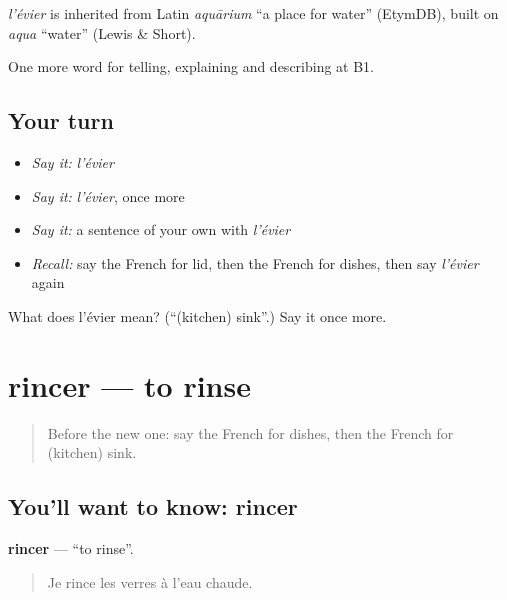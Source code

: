 \begin{cousinweb}
\emph{l'évier} is inherited from Latin \emph{aquārium} \textquotedblleft{}a place for water\textquotedblright{} (EtymDB), built on \emph{aqua} \textquotedblleft{}water\textquotedblright{} (Lewis \& Short).
\end{cousinweb}

\begin{grammarlens}[title={What you've built}]
One more word for telling, explaining and describing at B1.
\end{grammarlens}

\subsection*{Your turn}
\begin{itemize}
\raggedright
  \item \emph{Say it:} \emph{l'évier}
  \item \emph{Say it:} \emph{l'évier}, once more
  \item \emph{Say it:} a sentence of your own with \emph{l'évier}
  \item \emph{Recall:} say the French for lid, then the French for dishes, then say \emph{l'évier} again
\end{itemize}

\begin{tcolorbox}[breakable,colback=teal!4,colframe=teal!35!black,title={Before you move on}]
What does l'évier mean? (\textquotedblleft{}(kitchen) sink\textquotedblright{}.) Say it once more.
\end{tcolorbox}
\section[rincer]{rincer — to rinse}

\label{lesson:FR-C530-rincer}



\begin{quote}
Before the new one: say the French for dishes, then the French for (kitchen) sink.
\end{quote}

\subsection*{You'll want to know: rincer}
\textbf{rincer} — \textquotedblleft{}to rinse\textquotedblright{}.

\begin{quote}
Je rince les verres à l'eau chaude.
\end{quote}

